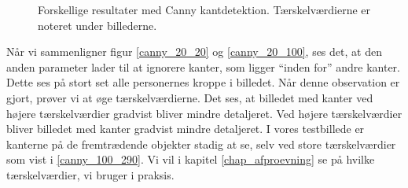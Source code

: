 {\begin{figure}[!p]
    \caption[]{Forskellige resultater med Canny kantdetektion.
    Tærskelværdierne er noteret under billederne.}
    \label{canny_kanter}
\end{figure}

Når vi sammenligner figur \ref{canny_20_20} og \ref{canny_20_100}, ses
det, at den anden parameter lader til at ignorere kanter, som ligger
``inden for'' andre kanter. Dette ses på stort set alle personernes
kroppe i billedet. Når denne observation er gjort, prøver vi at øge
tærskelværdierne. Det ses, at billedet med kanter ved højere
tærskelværdier gradvist bliver mindre detaljeret. Ved højere
tærskelværdier bliver billedet med kanter gradvist mindre detaljeret. I
vores testbillede er kanterne på de fremtrædende objekter stadig at se,
selv ved store tærskelværdier som vist i \ref{canny_100_290}. Vi vil i
kapitel \ref{chap_afproevning} se på hvilke tærskelværdier, vi bruger i
praksis.
}

